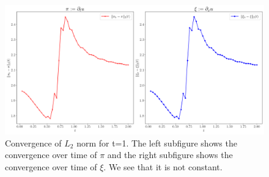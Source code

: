 \documentclass[reprint, prd, nofootinbib, superscriptaddress, floatfix]{revtex4-2}  %
\begin{document}
\begin{figure}[htbp]
  \includegraphics[width=16cm]{./figures/L2_convergence_over_time.png}
  \caption{Convergence of $L_2$ norm for t=1. The left subfigure shows the convergence over time of $\pi$ and the right subfigure shows the convergence over time of $\xi$. We see that it is not constant.}
  \label{fig:l2-convergence-t}
\end{figure}
\end{document}
